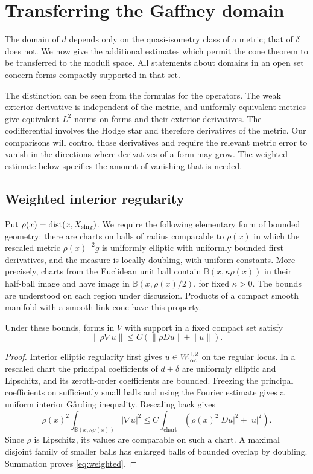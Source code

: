 \section{Transferring the Gaffney domain}\label{sec:comparison}

The domain of $d$ depends only on the quasi-isometry class of a
metric; that of $\delta$ does not. We now give the additional
estimates which permit the cone theorem to be transferred to the
moduli space. All statements about domains in an open set concern
forms compactly supported in that set.

The distinction can be seen from the formulas for the operators.
The weak exterior derivative is independent of the metric, and
uniformly equivalent metrics give equivalent $L^2$ norms on forms
and their exterior derivatives. The codifferential involves the
Hodge star and therefore derivatives of the metric. Our comparisons
will control those derivatives and require the relevant metric error
to vanish in the directions where derivatives of a form may grow.
The weighted estimate below specifies the amount of vanishing that
is needed.

\subsection{Weighted interior regularity}
Put $\rho(x)=\operatorname{dist}(x,X_{\mathrm{sing}})$. We require the
following elementary form of bounded geometry: there are charts on
balls of radius comparable to $\rho(x)$ in which the rescaled
metric $\rho(x)^{-2}g$ is uniformly elliptic with uniformly bounded
first derivatives, and the measure is locally doubling, with uniform
constants. More precisely, charts from the Euclidean unit ball
contain $\mathbb B(x,\kappa\rho(x))$ in their half-ball image and
have image in $\mathbb B(x,\rho(x)/2)$, for fixed $\kappa>0$.
The bounds are understood on each region under discussion.
Products of a compact smooth manifold with a smooth-link cone have
this property.

\begin{lemma}\label{lem:weighted}
Under these bounds, forms in $V$ with support in a fixed compact
set satisfy
\begin{equation}\label{eq:weighted}
 \|\rho\nabla u\|\le C(\|\rho Du\|+\|u\|).
\end{equation}
\end{lemma}
\begin{proof}
Interior elliptic regularity first gives $u\in W^{1,2}_{\rm loc}$
on the regular locus. In a rescaled chart the principal coefficients
of $d+\delta$ are uniformly elliptic and Lipschitz, and its
zeroth-order coefficients are bounded. Freezing the principal
coefficients on sufficiently small balls and using the Fourier
estimate gives a uniform interior G\aa rding inequality. Rescaling
back gives
\[
 \rho(x)^2\int_{\mathbb B(x,\kappa\rho(x))}|\nabla u|^2
 \le C\int_{\mathrm{chart}}(\rho(x)^2|Du|^2+|u|^2).
\]
Since $\rho$ is Lipschitz, its values are comparable on such a
chart. A maximal disjoint family of smaller balls has enlarged
balls of bounded overlap by doubling. Summation proves
\eqref{eq:weighted}.
\end{proof}

